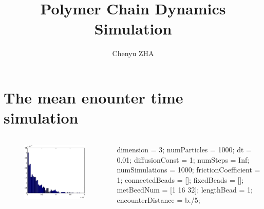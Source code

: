 \documentclass {beamer}
\title{\LARGE{Polymer Chain Dynamics Simulation}}
\author{Chenyu ZHA}
\begin{document}
\maketitle
\pagebreak
{}
\section{The mean enounter time simulation}
	\begin{frame}
	\begin{columns}
		\begin{column}{0.5\textwidth}
		\begin{figure}
		\includegraphics[width=1.3\textwidth]{MetTime4.eps}
		\end{figure}		
		\end{column}
		\begin{column}{0.3\textwidth}
		dimension = 3;
		numParticles = 1000;
		dt = 0.01;
		diffusionConst = 1;
		numSteps = Inf;
		\alert{numSimulations = 1000};
		frictionCoefficient = 1;
		connectedBeads = [];
		fixedBeads = [];
		metBeedNum = [1 16 32];
		lengthBead = 1;
		\alert{encounterDistance = b./5};
	   
		\end{column}
		\end{columns}
     	\end{frame}
\end{document}
